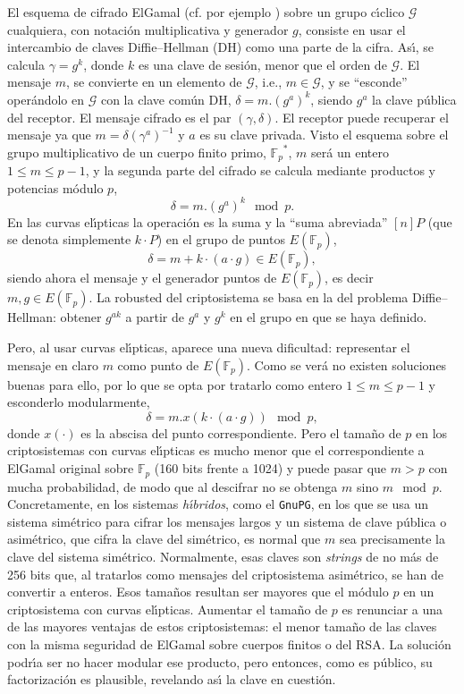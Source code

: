 \documentclass{cedi}%
\def\ces{curvas{} el\'{\i}pticas}%
\newcommand{\Fp}{\ensuremath{\mathbb{F}_p}}%
\newcommand{\EFp}{\ensuremath{E(\mathbb{F}_p)}}%
\theoremstyle{plain}        			%
\theoremstyle{definition}   			%
\theoremstyle{saltolinea}   			%
\begin{document}
El esquema de cifrado ElGamal (cf. por ejemplo \cite[\S{}8.4]{HAC}) sobre un grupo c\'{\i}clico $\mathcal{G}$ cualquiera, con notaci\'on multiplicativa y generador $g$, consiste en usar el intercambio de claves Diffie--Hellman (DH) como una parte de la cifra. As\'{\i}, se calcula $\gamma=g^k$, donde $k$ es una clave de sesi\'on, menor que el orden de $\mathcal{G}$. El mensaje $m$, se convierte en un elemento de $\mathcal{G}$, i.e., $m\in\mathcal{G}$, y se ``esconde'' oper\'andolo en $\mathcal{G}$ con la clave com\'un DH, $\delta=m.(g^a)^k$, siendo $g^a$ la clave p\'ublica del receptor. El mensaje cifrado es el par $(\gamma,\delta)$. El receptor puede recuperar el mensaje ya que $m=\delta(\gamma^a)^{-1}$ y $a$ es su clave privada. Visto el esquema sobre el grupo multiplicativo de un cuerpo finito primo, $\Fp^*$, $m$ ser\'a un entero $1\le m\le p-1$, y la segunda parte del cifrado se calcula mediante productos y potencias m\'odulo $p$,
$$\delta=m.(g^a)^k\mod{p}.$$
En las \ces{} la operaci\'on es la suma y la ``suma abreviada'' $[n]P$ (que se denota simplemente $k\cdot P$) en el grupo de puntos $\EFp$,
$$\delta=m+k\cdot(a\cdot g)\in\EFp,$$
siendo ahora el mensaje y el generador puntos de $\EFp$, es decir $m,g\in\EFp$. La robusted del criptosistema se basa en la del problema Diffie--Hellman: obtener $g^{ak}$ a partir de $g^a$ y $g^k$ en el grupo en que se haya definido.

Pero, al usar \ces{}, aparece una nueva dificultad: representar el mensaje en claro $m$ como punto de $\EFp$. Como se ver\'a no existen soluciones buenas para ello, por lo que se opta por tratarlo como entero $1\le m\le p-1$ y esconderlo modularmente,
$$\delta=m.x(k\cdot(a\cdot g))\mod{p},$$
donde $x(\cdot)$ es la abscisa del punto correspondiente. Pero el tama\~no de $p$ en los criptosistemas con \ces{} es mucho menor que el correspondiente a ElGamal original sobre $\Fp$ (160 bits frente a 1024) y puede pasar que $m>p$ con mucha probabilidad, de modo que al descifrar no se obtenga $m$ sino $m\mod{p}$. Concretamente, en los sistemas \emph{h\'{\i}bridos}, como el \texttt{GnuPG}, en los que se usa un sistema sim\'etrico para cifrar los mensajes largos y un sistema de clave p\'ublica o asim\'etrico, que cifra la clave del sim\'etrico, es normal que $m$ sea precisamente la clave del sistema sim\'etrico. Normalmente, esas claves son \emph{strings} de no m\'as de 256 bits que, al tratarlos como mensajes del criptosistema asim\'etrico, se han de convertir a enteros. Esos tama\~nos resultan ser mayores que el m\'odulo $p$ en un criptosistema con \ces{}. Aumentar el tama\~no de $p$ es renunciar a una de las mayores ventajas de estos criptosistemas: el menor tama\~no de las claves con la misma seguridad de ElGamal sobre cuerpos finitos o del RSA. La soluci\'on podr\'{\i}a ser no hacer modular ese producto, pero entonces, como es p\'ublico, su factorizaci\'on es plausible, revelando as\'{\i} la clave en cuesti\'on.
\end{document}
